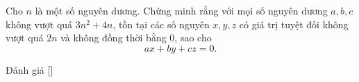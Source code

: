 \ifshowproblem
\begin{problem}\label{problem:CHN-2015-TST1-P5}
	Cho \( n \) là một số nguyên dương. Chứng minh rằng với mọi số nguyên dương \( a, b, c \) không vượt quá \( 3n^2 + 4n \),
	tồn tại các số nguyên \( x, y, z \) có giá trị tuyệt đối không vượt quá \( 2n \) và không đồng thời bằng 0, sao cho
	\[
		ax + by + cz = 0.
	\]
\end{problem}
\fi

\ifshowinfo
Đánh giá [\textbf{}]\footnotemark
{}
\fi